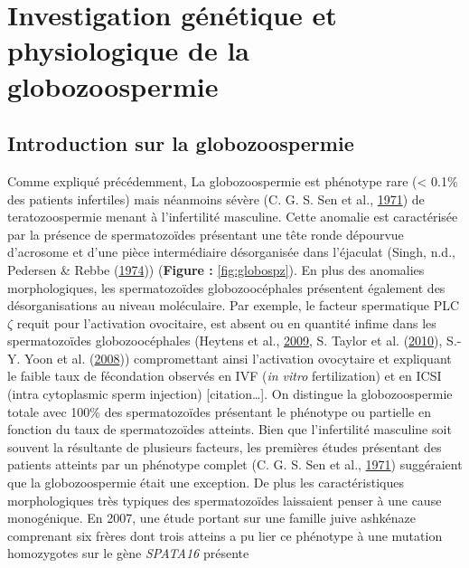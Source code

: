 \documentclass[12pt,twoside]{reedthesis}
\theoremstyle{definition}
\theoremstyle{definition}
\theoremstyle{remark}
\begin{document}
  \hypertarget{globo}{\chapter{Investigation génétique et physiologique de
  la globozoospermie}\label{globo}}
  
  \section{Introduction sur la
  globozoospermie}\label{introduction-sur-la-globozoospermie}
  
  Comme expliqué précédemment, La globozoospermie est phénotype rare
  (\textless{} 0.1\% des patients infertiles) mais néanmoins sévère (C. G.
  S. Sen et al., \protect\hyperlink{ref-Sen2009}{1971}) de
  teratozoospermie menant à l'infertilité masculine. Cette anomalie est
  caractérisée par la présence de spermatozoïdes présentant une tête ronde
  dépourvue d'acrosome et d'une pièce intermédiaire désorganisée dans
  l'éjaculat (Singh, n.d., Pedersen \& Rebbe
  (\protect\hyperlink{ref-Pedersen1974}{1974})) (\textbf{Figure :
  }\ref{fig:globospz}). En plus des anomalies morphologiques, les
  spermatozoïdes globozoocéphales présentent également des
  désorganisations au niveau moléculaire. Par exemple, le facteur
  spermatique PLC\(\zeta\) requit pour l'activation ovocitaire, est absent
  ou en quantité infime dans les spermatozoïdes globozoocéphales (Heytens
  et al., \protect\hyperlink{ref-Heytens2009}{2009}, S. Taylor et al.
  (\protect\hyperlink{ref-Taylor2010}{2010}), S.-Y. Yoon et al.
  (\protect\hyperlink{ref-Yoon2008}{2008})) compromettant ainsi
  l'activation ovocytaire et expliquant le faible taux de fécondation
  observés en IVF (\emph{in vitro} fertilization) et en ICSI (intra
  cytoplasmic sperm injection) {[}citation\ldots{}{]}. On distingue la
  globozoospermie totale avec 100\% des spermatozoïdes présentant le
  phénotype ou partielle en fonction du taux de spermatozoïdes atteints.
  Bien que l'infertilité masculine soit souvent la résultante de plusieurs
  facteurs, les premières études présentant des patients atteints par un
  phénotype complet (C. G. S. Sen et al.,
  \protect\hyperlink{ref-Sen2009}{1971}) suggéraient que la
  globozoospermie était une exception. De plus les caractéristiques
  morphologiques très typiques des spermatozoïdes laissaient penser à une
  cause monogénique. En 2007, une étude portant sur une famille juive
  ashkénaze comprenant six frères dont trois atteins a pu lier ce
  phénotype à une mutation homozygotes sur le gène \emph{SPATA16} présente
\end{document}
